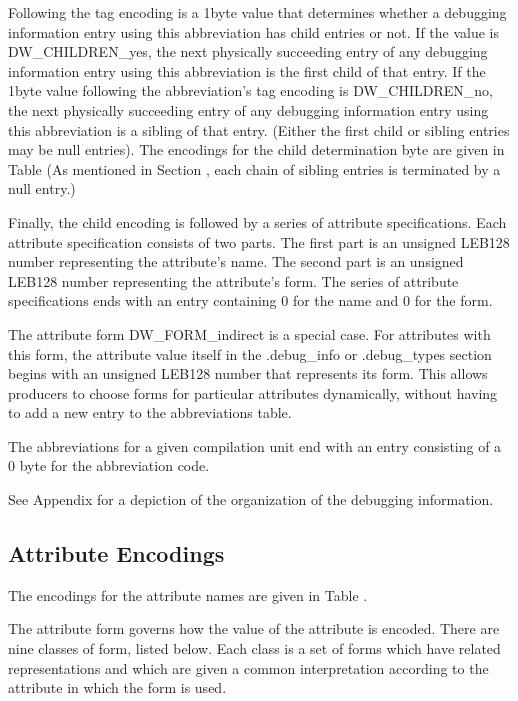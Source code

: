 Following the tag encoding is a 1\dash byte value that determines
whether a debugging information entry using this abbreviation
has child entries or not. If the value is DW\_CHILDREN\_yes,
the next physically succeeding entry of any debugging
information entry using this abbreviation is the first
child of that entry. If the 1\dash byte value following the
abbreviation’s tag encoding is DW\_CHILDREN\_no, the next
physically succeeding entry of any debugging information entry
using this abbreviation is a sibling of that entry. (Either
the first child or sibling entries may be null entries). The
encodings for the child determination byte are given in 
Table 
(As mentioned in 
Section , 
each chain of
sibling entries is terminated by a null entry.)

Finally, the child encoding is followed by a series of
attribute specifications. Each attribute specification
consists of two parts. The first part is an unsigned LEB128
number representing the attribute’s name. The second part
is an unsigned LEB128 number representing the attribute’s
form. The series of attribute specifications ends with an
entry containing 0 for the name and 0 for the form.

The attribute form DW\_FORM\_indirect is a special case. For
attributes with this form, the attribute value itself in the
.debug\_info or .debug\_types section begins with an unsigned
LEB128 number that represents its form. This allows producers
to choose forms for particular attributes dynamically,
without having to add a new entry to the abbreviations table.

The abbreviations for a given compilation unit end with an
entry consisting of a 0 byte for the abbreviation code.

See 
Appendix  
for a depiction of the organization of the
debugging information.

\subsection{Attribute Encodings}
\label{datarep:attributeencodings}

The encodings for the attribute names are given in 
Table .

The attribute form governs how the value of the attribute is
encoded. There are nine classes of form, listed below. Each
class is a set of forms which have related representations
and which are given a common interpretation according to the
attribute in which the form is used.

